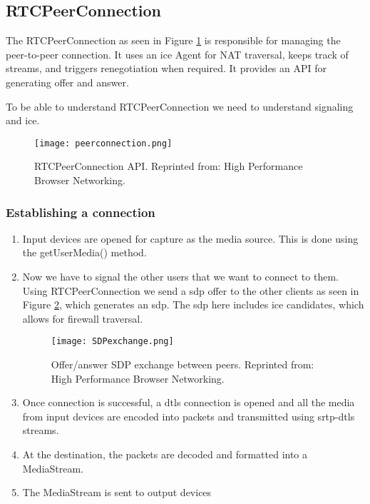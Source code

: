 \subsection{RTCPeerConnection}
The RTCPeerConnection as seen in Figure \ref{fig:rtcpeerconnection} is responsible for managing the peer-to-peer connection. It uses an \gls{ice} Agent for NAT traversal, keeps track of streams, and triggers renegotiation when required. It provides an API for generating offer and answer.

To be able to understand RTCPeerConnection we need to understand signaling and \gls{ice}.

\begin{figure}[here]
\centerline{\texttt{[image: peerconnection.png]}}
\caption{RTCPeerConnection API. Reprinted from: High Performance Browser Networking\cite{grigorik_high_2013}.}
\label{fig:rtcpeerconnection}
\end{figure}

\subsubsection{Establishing a connection}

\begin{enumerate}
\item Input devices are opened for capture as the media source. This is done using the getUserMedia() method.
\item Now we have to signal the other users that we want to connect to them. Using RTCPeerConnection we send a \gls{sdp} offer to the other clients as seen in Figure \ref{fig:sdp-exchange}, which generates an \gls{sdp}. The \gls{sdp} here includes \gls{ice} candidates,  which allows for firewall traversal.

\begin{figure}[here]
\centerline{\texttt{[image: SDPexchange.png]}}
\caption{Offer/answer SDP exchange between peers. Reprinted from: High Performance Browser Networking\cite{grigorik_high_2013}.}
\label{fig:sdp-exchange}
\end{figure}

\item Once connection is successful, a \gls{dtls} connection is opened and all the media from input devices are encoded into packets and transmitted using \gls{srtp}-\gls{dtls} streams.
\item At the destination, the packets are decoded and formatted into a MediaStream.
\item The MediaStream is sent to output devices
\end{enumerate}


